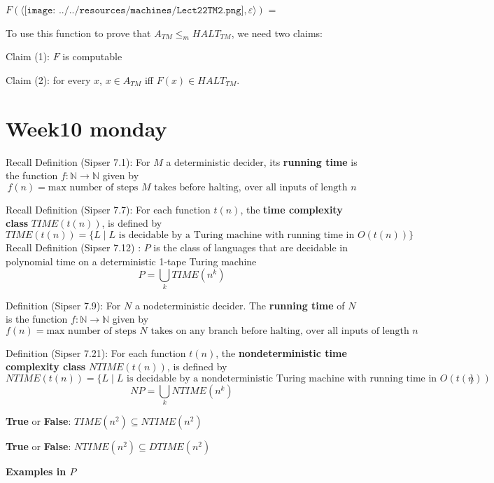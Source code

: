 \documentclass[12pt, oneside]{article}
\begin{document}
    $F( \langle \texttt{[image: ../../resources/machines/Lect22TM2.png]} ,  \varepsilon  \rangle)$ =

    To use this function  to prove that $A_{TM} \leq_m HALT_{TM}$, we need  two claims:

    
    Claim (1): $F$ is computable \phantom{\hspace{2in}}
    
    \vfill

    Claim (2): for every  $x$,  $x \in  A_{TM}$ iff $F(x) \in HALT_{TM}$.  
    
    \vfill
    \vfill
    \vfill \vfill
\section*{Week10 monday}


Recall Definition  (Sipser 7.1): For  $M$ a deterministic decider, its {\bf running time} is the function  $f: \mathbb{N} \to \mathbb{N}$
given  by
\[
f(n) =  \text{max number of  steps $M$ takes before halting, over all inputs  of length $n$}
\]

Recall Definition (Sipser 7.7): For each function $t(n)$, the {\bf time complexity class}  $TIME(t(n))$, is defined  by
\[
TIME( t(n)) = \{ L \mid \text{$L$ is decidable by  a Turing machine with running time in  $O(t(n))$} \}
\]
Recall Definition (Sipser 7.12) : $P$ is the class of languages that  are decidable in polynomial time on 
a deterministic 1-tape  Turing  machine
\[
P  =  \bigcup_k TIME(n^k)
\]

Definition (Sipser  7.9): For $N$ a nodeterministic decider.  
The {\bf running time} of $N$ is the function $f: \mathbb{N} \to \mathbb{N}$ given  by
\[
f(n) =  \text{max number of  steps $N$ takes on  any branch before halting, over all inputs  of length $n$}
\]

Definition (Sipser 7.21): For each function $t(n)$, the {\bf nondeterministic time complexity class}  
$NTIME(t(n))$, is defined  by
\[
NTIME( t(n)) = \{ L \mid \text{$L$ is decidable by a nondeterministic Turing machine with running time in $O(t(n))$} \}
\]
\[
NP = \bigcup_k NTIME(n^k)
\]


{\bf True} or {\bf False}: $TIME(n^2) \subseteq NTIME(n^2)$

\vfill

{\bf True} or {\bf False}: $NTIME(n^2) \subseteq DTIME(n^2)$

\vfill
\newpage

{\bf Examples in $P$ }
\end{document}
